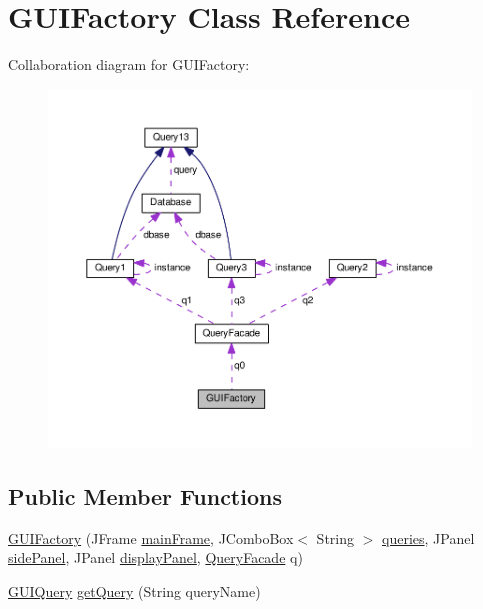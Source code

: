 \hypertarget{classGUIFactory}{}\section{G\+U\+I\+Factory Class Reference}
\label{classGUIFactory}


Collaboration diagram for G\+U\+I\+Factory\+:\nopagebreak
\begin{figure}[H]
\begin{center}
\leavevmode
\includegraphics[width=350pt]{classGUIFactory__coll__graph}
\end{center}
\end{figure}
\subsection*{Public Member Functions}
\begin{DoxyCompactItemize}
\item 
\hyperlink{classGUIFactory_a133845e2346ee4986e09793e48a90241}{G\+U\+I\+Factory} (J\+Frame \hyperlink{classGUIFactory_afb70d82da7ea373c87a3cb8c2f6eb075}{main\+Frame}, J\+Combo\+Box$<$ String $>$ \hyperlink{classGUIFactory_a244f5c63e4a280528e2b08316a652287}{queries}, J\+Panel \hyperlink{classGUIFactory_a76d0958fe1b53efd8953c3744fc9db01}{side\+Panel}, J\+Panel \hyperlink{classGUIFactory_aa9d579163a66ea0c377f2dc87f9449dd}{display\+Panel}, \hyperlink{classQueryFacade}{Query\+Facade} q)
\item 
\hyperlink{classGUIQuery}{G\+U\+I\+Query} \hyperlink{classGUIFactory_a2b891d0369711430ae1d172f15b78317}{get\+Query} (String query\+Name)
\end{DoxyCompactItemize}
